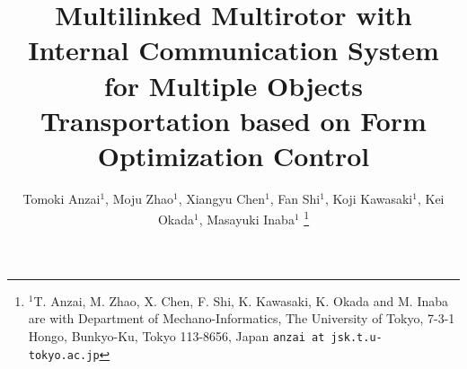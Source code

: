 \documentclass[letterpaper, 10 pt, conference]{ieeeconf}  %
\title{\LARGE \bf
  Multilinked Multirotor with Internal Communication System for Multiple Objects Transportation based on Form Optimization Control
}
\author{Tomoki Anzai$^{1}$, Moju Zhao$^{1}$, Xiangyu Chen$^{1}$, Fan Shi$^{1}$, Koji Kawasaki$^{1}$, Kei Okada$^{1}$, Masayuki Inaba$^{1}$%
\thanks{$^{1}$T. Anzai, M. Zhao, X. Chen, F. Shi, K. Kawasaki, K. Okada and M. Inaba are with Department of Mechano-Informatics, The University of Tokyo, 7-3-1 Hongo, Bunkyo-Ku, Tokyo 113-8656, Japan
       {\tt\small anzai at jsk.t.u-tokyo.ac.jp}}%
}
\begin{document}
\maketitle
\thispagestyle{empty}
\pagestyle{empty}

\begin{abstract}

\end{abstract}









\addtolength{\textheight}{-12cm}   %

%
%
\end{document}
